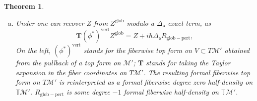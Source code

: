 \documentclass[11pt,a4paper]{amsart}
\theoremstyle{plain} %
\newtheorem{thm}{Theorem}[section]
\theoremstyle{definition}
\theoremstyle{remark}
\newcommand{\g}{\mathfrak{g}}
\newcommand{\mr}{\mathrm}
\newcommand{\sfa}{\mathsf{a}}
\newcommand{\bt}{\bullet}
\newcommand{\M}{\mathcal{M}}
\begin{document}
\begin{thm}
\begin{enumerate}[(a)]
    The formal exponential map induces a flat connection $\nabla^G$ (``Grothendieck connection'')
    on the bundle of formal fiberwise  half-densities on $\mathbb{T}\M'$, and the perturbative partition function is a horizontal section modulo a $\Delta_\sfa$-exact term:
    \begin{equation}\label{intro: horizontality eq}
        \nabla^G Z= -i\hbar\Delta_\sfa R_1
    \end{equation}
    with some degree $-1$ generator $R_1\in \Omega^1(\M',\mr{Dens}^{\frac12,\mr{formal}}(\mathbb{T}\M'))$.
    \item \label{intro thm A (c)} 
    Under 
    one can recover $Z$ from $Z^\mr{glob}$ modulo a $\Delta_\sfa$-exact term, as
    \begin{equation}\label{intro phi^* Z^glob = Z^pert+Delta(...)}
        \mathbf{T} (\phi^*)^\mr{vert} Z^\mr{glob} = Z+i\hbar\Delta_\sfa R_\mr{glob-pert},
    \end{equation}
    On the left, $(\phi^*)^\mr{vert}$ stands for the fiberwise top form on $V\subset T\M'$ obtained from the pullback of a top form on $\M'$;
    $\mathbf{T}$ stands for taking the Taylor expansion in the fiber coordinates on $T\M'$. The resulting formal fiberwise top form on $T\M'$ is reinterpreted as a formal fiberwise degree zero half-density on $\mathbb{T}\M'$. $R_\mr{glob-pert}$ is some degree $-1$ formal fiberwise half-density on $\mathbb{T}\M'$.
\end{enumerate}  
\end{thm}
\end{document}
